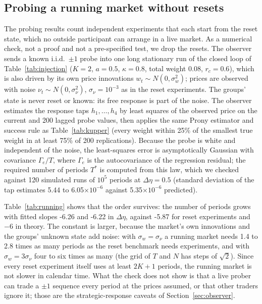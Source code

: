\subsection{Probing a running market without resets}\label{app:running}
The probing results count independent experiments that each start from the reset state, which no outside participant can arrange in a live market. As a numerical check, not a proof and not a pre-specified test, we drop the resets. The observer sends a known i.i.d.\ $\pm1$ probe into one long stationary run of the closed loop of Table~\ref{tab:injection} ($K=2$, $a=0.5$, $\kappa=0.8$, total weight $0.08$, $r_c=0.6$), which is also driven by its own price innovations $w_t\sim N(0,\sigma_w^2)$; prices are observed with noise $\nu_t\sim N(0,\sigma_\nu^2)$, $\sigma_\nu=10^{-3}$ as in the reset experiments. The groups' state is never reset or known: its free response is part of the noise. The observer estimates the response taps $h_1,\ldots,h_4$ by least squares of the observed price on the current and 200 lagged probe values, then applies the same Prony estimator and success rule as Table~\ref{tab:kupper} (every weight within 25\% of the smallest true weight in at least 75\% of 200 replications). Because the probe is white and independent of the noise, the least-squares error is asymptotically Gaussian with covariance $\Gamma_e/T$, where $\Gamma_e$ is the autocovariance of the regression residual; the required number of periods $T^*$ is computed from this law, which we checked against 120 simulated runs of $10^5$ periods at $\Delta\eta=0.5$ (standard deviation of the tap estimates 5.44 to 6.05$\times10^{-6}$ against 5.35$\times10^{-6}$ predicted).

Table~\ref{tab:running} shows that the order survives: the number of periods grows with fitted slopes -6.26 and -6.22 in $\Delta\eta$, against -5.87 for reset experiments and $-6$ in theory. The constant is larger, because the market's own innovations and the groups' unknown state add noise: with $\sigma_w=\sigma_\nu$ a running market needs 1.4 to 2.8 times as many periods as the reset benchmark needs experiments, and with $\sigma_w=3\sigma_\nu$ four to six times as many (the grid of $T$ and $N$ has steps of $\sqrt2$). Since every reset experiment itself uses at least $2K+1$ periods, the running market is not slower in calendar time. What the check does not show is that a live prober can trade a $\pm1$ sequence every period at the prices assumed, or that other traders ignore it; those are the strategic-response caveats of Section~\ref{sec:observer}.

